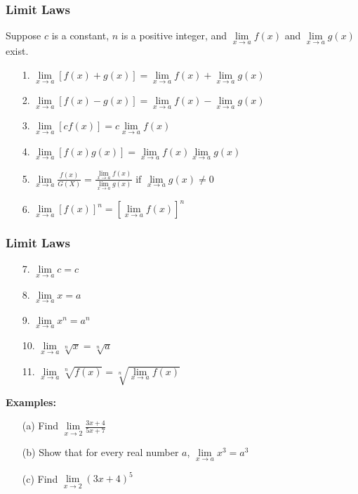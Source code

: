 \documentclass{beamer}
\begin{document}
\begin{frame}
\frametitle{\textbf{Limit Laws}}
Suppose $c$ is a constant, $n$ is a positive integer, and $\lim\limits_{x \to a}f(x)$ and $\lim\limits_{x \to a}g(x)$ exist.
\begin{itemize}
	\item[1.] $\lim\limits_{x \to a} [f(x)+g(x)] = \lim\limits_{x \to a}f(x) + \lim\limits_{x \to a}g(x)$
	\item[2.] $\lim\limits_{x \to a} [f(x)-g(x)] = \lim\limits_{x \to a}f(x) - \lim\limits_{x \to a}g(x)$
	\item[3.]$\lim\limits_{x \to a}[cf(x)] = c\lim\limits_{x \to a}f(x)$
	\item[4.]$\lim\limits_{x \to a}[f(x)g(x)] = \lim\limits_{x \to a}f(x)\lim\limits_{x \to a}g(x)$
	\item[5.]$\lim\limits_{x \to a}\frac{f(x)}{G(X)} = \frac{\lim\limits_{x \to a}f(x)}{\lim\limits_{x \to a}g(x)} \mbox{ if } \lim\limits_{x \to a} g(x) \neq 0$
	\item[6.]$\lim\limits_{x \to a}[f(x)]^n = [\lim\limits_{x \to a}f(x)]^n$
\end{itemize}
\end{frame}

\begin{frame}
\frametitle{\textbf{Limit Laws}}

\begin{itemize}
	\item[7.]$\lim\limits_{x \to a}c=c$
	\item[8.]$\lim\limits_{x \to a}x=a$
	\item[9.]$\lim\limits_{x \to a}x^n = a^n$
	\item[10.]$\lim\limits_{x \to a} \sqrt[n]{x} = \sqrt[n]{a}$
	\item[11.]$\lim\limits_{x \to a} \sqrt[n]{f(x)} = \sqrt[n]{\lim\limits_{x \to a} f(x)}$
\end{itemize}

\vspace{12pt}

\textbf{Examples:}
\begin{itemize}
	\item[(a)] Find $\lim\limits_{x \to 2}\frac{3x+4}{5x+7}$
	\item[(b)] Show that for every real number $a$, $\lim\limits_{x \to a}x^3=a^3$
	\item[(c)] Find $\lim\limits_{x \to 2}(3x+4)^5$
\end{itemize}
\end{frame}
\end{document}
